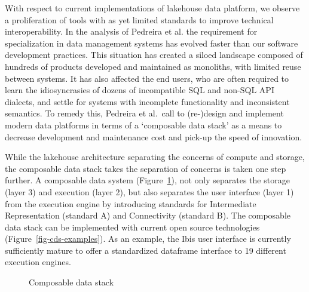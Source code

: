 \documentclass[
  authoryear]{elsarticle}
\begin{document}
With respect to current implementations of lakehouse data platform, we
observe a proliferation of tools with as yet limited standards to
improve technical interoperability. In the analysis of Pedreira et al.
\citep{pedreira2023composable} the requirement for specialization in
data management systems has evolved faster than our software development
practices. This situation has created a siloed landscape composed of
hundreds of products developed and maintained as monoliths, with limited
reuse between systems. It has also affected the end users, who are often
required to learn the idiosyncrasies of dozens of incompatible SQL and
non-SQL API dialects, and settle for systems with incomplete
functionality and inconsistent semantics. To remedy this, Pedreira et
al.~call to (re-)design and implement modern data platforms in terms of
a `composable data stack' as a means to decrease development and
maintenance cost and pick-up the speed of innovation.

While the lakehouse architecture separating the concerns of compute and
storage, the composable data stack takes the separation of concerns is
taken one step further. A composable data system
(Figure~\ref{fig-composable-data-stack}), not only separates the storage
(layer 3) and execution (layer 2), but also separates the user interface
(layer 1) from the execution engine by introducing standards for
Intermediate Representation (standard A) and Connectivity (standard B).
The composable data stack can be implemented with current open source
technologies (Figure~\ref{fig-cds-examples}). As an example, the Ibis
user interface is currently sufficiently mature to offer a standardized
dataframe interface to 19 different execution engines.

\begin{figure}


\caption{\label{fig-composable-data-stack}Composable data stack}

\end{figure}%
\end{document}
